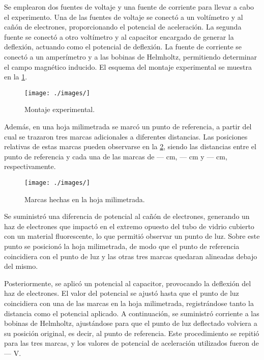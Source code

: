 Se emplearon dos fuentes de voltaje y una fuente de corriente para llevar a cabo
el experimento.
Una de las fuentes de voltaje se conectó a un voltímetro y al cañón de
electrones, proporcionando el potencial de aceleración.
La segunda fuente se conectó a otro voltímetro y al capacitor encargado de
generar la deflexión, actuando como el potencial de deflexión.
La fuente de corriente se conectó a un amperímetro y a las bobinas de Helmholtz,
permitiendo determinar el campo magnético inducido.
El esquema del montaje experimental se muestra en la \cref{fig:set-up}.

\begin{figure}[htbp!]
  \centering
  \texttt{[image: ./images/]}
  \caption{Montaje experimental.}
  \label{fig:set-up}
\end{figure}

Además, en una hoja milimetrada se marcó un punto de referencia, a partir del
cual se trazaron tres marcas adicionales a diferentes distancias.
Las posiciones relativas de estas marcas pueden observarse en la \cref{fig:marks},
siendo las distancias entre el punto de referencia y cada una de las marcas de
--- cm, --- cm y --- cm, respectivamente.

\begin{figure}[htbp!]
  \centering
  \texttt{[image: ./images/]}
  \caption{Marcas hechas en la hoja milimetrada.}
  \label{fig:marks}
\end{figure}

Se suministró una diferencia de potencial al cañón de electrones, generando un
haz de electrones que impactó en el extremo opuesto del tubo de vidrio cubierto
con un material fluorescente, lo que permitió observar un punto de luz.
Sobre este punto se posicionó la hoja milimetrada, de modo que el punto de
referencia coincidiera con el punto de luz y las otras tres marcas quedaran
alineadas debajo del mismo.

Posteriormente, se aplicó un potencial al capacitor, provocando la deflexión del
haz de electrones.
El valor del potencial se ajustó hasta que el punto de luz coincidiera con una
de las marcas en la hoja milimetrada, registrándose tanto la distancia como el
potencial aplicado.
A continuación, se suministró corriente a las bobinas de Helmholtz, ajustándose
para que el punto de luz deflectado volviera a su posición original, es decir,
al punto de referencia.
Este procedimiento se repitió para las tres marcas, y los valores de potencial
de aceleración utilizados fueron de --- V.
